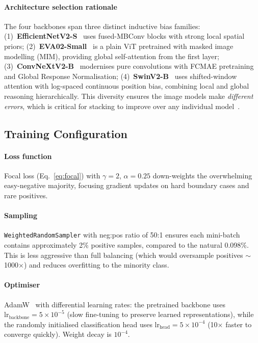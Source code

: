 \documentclass[conference]{IEEEtran}
\begin{document}
\paragraph{Architecture selection rationale}
The four backbones span three distinct inductive bias families:
(1)~\textbf{EfficientNetV2-S}~\cite{tan2021efficientnetv2} uses
fused-MBConv blocks with strong local spatial priors;
(2)~\textbf{EVA02-Small}~\cite{fang2023eva02} is a plain ViT pretrained
with masked image modelling (MIM), providing global self-attention
from the first layer;
(3)~\textbf{ConvNeXtV2-B}~\cite{woo2023convnextv2} modernises pure
convolutions with FCMAE pretraining and Global Response Normalisation;
(4)~\textbf{SwinV2-B}~\cite{liu2022swinv2} uses shifted-window attention
with log-spaced continuous position bias, combining local and global
reasoning hierarchically.
This diversity ensures the image models make \emph{different errors},
which is critical for stacking to improve over any individual
model~\cite{caruana2004ensemble}.

\subsection{Training Configuration}

\paragraph{Loss function}
Focal loss (Eq.~\ref{eq:focal}) with $\gamma{=}2$, $\alpha{=}0.25$
down-weights the overwhelming easy-negative majority, focusing gradient
updates on hard boundary cases and rare positives.

\paragraph{Sampling}
\texttt{WeightedRandomSampler} with neg:pos ratio of 50:1 ensures
each mini-batch contains approximately 2\% positive samples, compared
to the natural 0.098\%. This is less aggressive than full balancing
(which would oversample positives $\sim$1000$\times$) and reduces
overfitting to the minority class.

\paragraph{Optimiser}
AdamW~\cite{loshchilov2019adamw} with differential learning rates:
the pretrained backbone uses $\text{lr}_\text{backbone} = 5 \times 10^{-5}$
(slow fine-tuning to preserve learned representations), while the
randomly initialised classification head uses
$\text{lr}_\text{head} = 5 \times 10^{-4}$ (10$\times$ faster to
converge quickly). Weight decay is $10^{-4}$.
\end{document}
